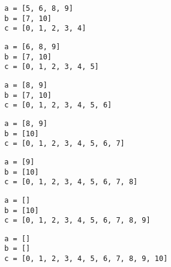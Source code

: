 \begin{frame}[fragile]
\begin{verbatim}
        a = [5, 6, 8, 9]
        b = [7, 10]
        c = [0, 1, 2, 3, 4]
\end{verbatim}
\end{frame}
\addtocounter{framenumber}{-1}

\begin{frame}[fragile]
\begin{verbatim}
        a = [6, 8, 9]
        b = [7, 10]
        c = [0, 1, 2, 3, 4, 5]
\end{verbatim}
\end{frame}
\addtocounter{framenumber}{-1}

\begin{frame}[fragile]
\begin{verbatim}
        a = [8, 9]
        b = [7, 10]
        c = [0, 1, 2, 3, 4, 5, 6]
\end{verbatim}
\end{frame}
\addtocounter{framenumber}{-1}

\begin{frame}[fragile]
\begin{verbatim}
        a = [8, 9]
        b = [10]
        c = [0, 1, 2, 3, 4, 5, 6, 7]
\end{verbatim}
\end{frame}
\addtocounter{framenumber}{-1}

\begin{frame}[fragile]
\begin{verbatim}
        a = [9]
        b = [10]
        c = [0, 1, 2, 3, 4, 5, 6, 7, 8]
\end{verbatim}
\end{frame}
\addtocounter{framenumber}{-1}

\begin{frame}[fragile]
\begin{verbatim}
        a = []
        b = [10]
        c = [0, 1, 2, 3, 4, 5, 6, 7, 8, 9]
\end{verbatim}
\end{frame}
\addtocounter{framenumber}{-1}

\begin{frame}[fragile]
\begin{verbatim}
        a = []
        b = []
        c = [0, 1, 2, 3, 4, 5, 6, 7, 8, 9, 10]
\end{verbatim}
\end{frame}
\addtocounter{framenumber}{-1}

